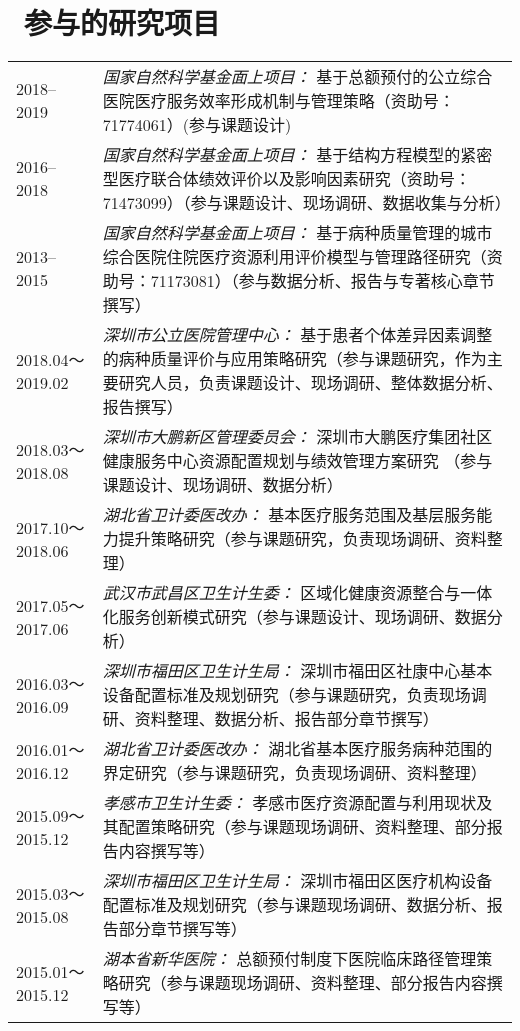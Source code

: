 \documentclass{resume}
\begin{document}
\section{\faPuzzlePiece\ 参与的研究项目}
\begin{longtable}{l p{12cm}}
2018--2019 & \textit{国家自然科学基金面上项目：} 基于总额预付的公立综合医院医疗服务效率形成机制与管理策略（资助号：71774061）(参与课题设计)\\[5pt]

2016--2018 & \textit{国家自然科学基金面上项目：} 基于结构方程模型的紧密型医疗联合体绩效评价以及影响因素研究（资助号：71473099）（参与课题设计、现场调研、数据收集与分析）\\[5pt]

2013--2015 & \textit{国家自然科学基金面上项目：} 基于病种质量管理的城市综合医院住院医疗资源利用评价模型与管理路径研究（资助号：71173081）（参与数据分析、报告与专著核心章节撰写）\\[5pt]

2018.04～2019.02 & \textit{深圳市公立医院管理中心：} 基于患者个体差异因素调整的病种质量评价与应用策略研究（参与课题研究，作为主要研究人员，负责课题设计、现场调研、整体数据分析、 报告撰写）\\[5pt]

2018.03～2018.08 & \textit{深圳市大鹏新区管理委员会：} 深圳市大鹏医疗集团社区健康服务中心资源配置规划与绩效管理方案研究 （参与课题设计、现场调研、数据分析）\\[5pt]

2017.10～2018.06 & \textit{湖北省卫计委医改办：} 基本医疗服务范围及基层服务能力提升策略研究（参与课题研究，负责现场调研、资料整理）\\[5pt]

2017.05～2017.06 & \textit{武汉市武昌区卫生计生委：} 区域化健康资源整合与一体化服务创新模式研究（参与课题设计、现场调研、数据分析）\\[5pt]

2016.03～2016.09 & \textit{深圳市福田区卫生计生局：} 深圳市福田区社康中心基本设备配置标准及规划研究（参与课题研究，负责现场调研、资料整理、数据分析、报告部分章节撰写）\\[5pt]

2016.01～2016.12 & \textit{湖北省卫计委医改办：} 湖北省基本医疗服务病种范围的界定研究（参与课题研究，负责现场调研、资料整理）\\[5pt]

2015.09～2015.12 & \textit{孝感市卫生计生委：} 孝感市医疗资源配置与利用现状及其配置策略研究（参与课题现场调研、资料整理、部分报告内容撰写等）\\[5pt]

2015.03～2015.08 & \textit{深圳市福田区卫生计生局：} 深圳市福田区医疗机构设备配置标准及规划研究（参与课题现场调研、数据分析、报告部分章节撰写等）\\[5pt]

2015.01～2015.12 & \textit{湖本省新华医院：} 总额预付制度下医院临床路径管理策略研究（参与课题现场调研、资料整理、部分报告内容撰写等）\\[5pt]

\end{longtable}
\end{document}
